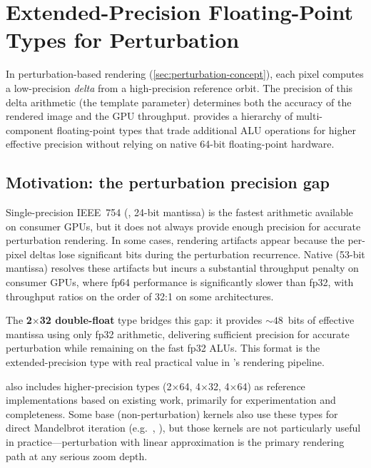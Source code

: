 \section{Extended-Precision Floating-Point Types for Perturbation}
\label{sec:extended-precision-types}

In perturbation-based rendering (\cref{sec:perturbation-concept}), each pixel
computes a low-precision \emph{delta} from a high-precision reference orbit.
The precision of this delta arithmetic (the  template parameter)
determines both the accuracy of the rendered image and the GPU throughput.
\FractalShark{} provides a hierarchy of multi-component floating-point types
that trade additional ALU operations for higher effective precision without
relying on native 64-bit floating-point hardware.

\subsection{Motivation: the perturbation precision gap}
\label{subsec:ep-motivation}

Single-precision IEEE~754 (, 24-bit mantissa) is the fastest
arithmetic available on consumer GPUs, but it does not always provide enough
precision for accurate perturbation rendering.  In some cases,
rendering artifacts appear because the per-pixel deltas lose significant bits
during the perturbation recurrence.  Native  (53-bit mantissa)
resolves these artifacts but incurs a substantial throughput penalty on consumer
GPUs, where fp64 performance is significantly slower than fp32, with throughput ratios on the order of 32:1 on some architectures.

The \textbf{2$\times$32 double-float} type bridges this gap: it provides
${\sim}48$~bits of effective mantissa using only fp32 arithmetic, delivering
sufficient precision for accurate perturbation while remaining on the fast
fp32 ALUs.  This format is the extended-precision type with real practical value in
\FractalShark{}'s rendering pipeline.

\FractalShark{} also includes higher-precision types (2$\times$64,
4$\times$32, 4$\times$64) as reference implementations based on existing work,
primarily for experimentation and completeness.  Some base (non-perturbation)
kernels also use these types for direct Mandelbrot iteration (e.g.\
, ), but those kernels are not
particularly useful in practice---perturbation with linear approximation is the
primary rendering path at any serious zoom depth.

